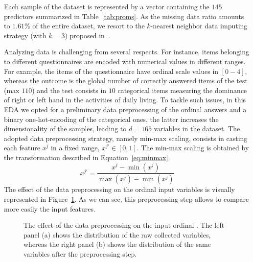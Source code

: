 Each sample of the dataset is represented by a vector containing the $145$ predictors summarized in Table~\ref{tab:proms}.
As the missing data ratio amounts to $1.61\%$ of the entire dataset, we resort to the $k$-nearest neighbor data imputing strategy (with $k=3$) proposed in~\cite{troyanskaya2001missing}.

Analyzing \PCO data is challenging from several respects.
For instance, items belonging to different questionnaires are encoded with numerical values in different ranges.
For example, the items of the \MFIS questionnaire have ordinal scale values in $[0-4]$, whereas the \SDMT outcome is the global number of correctly answered items of the test (max $110$) and the \EDINB test consists in $10$ categorical items measuring the dominance of right or left hand in the activities of daily living.
To tackle such issues, in this EDA we opted for a preliminary data preprocessing of the ordinal answers and a binary one-hot-encoding of the categorical ones, the latter increases the dimensionality of the samples, leading to $d=165$ variables in the dataset.
The adopted data preprocessing strategy, namely min-max scaling, consists in casting each feature $x^j$ in a fixed range, \ie $x^{j'} \in [0, 1]$. The min-max scaling is obtained by the transformation described in Equation~\eqref{eq:minmax}.
\begin{equation} \label{eq:minmax}
	x^{j'} = \frac{x^j - \min(x^j)}{\max(x^j) - \min(x^j)}
\end{equation}
The effect of the data preprocessing on the ordinal input variables is visually represented in Figure~\ref{fig:ms_boxplots}. As we can see, this preprocessing step allows to compare more easily the input features.

\begin{figure}[]
	\centering
	\caption{The effect of the data preprocessing on the input ordinal \PCOs. The left panel (a) shows the distribution of the raw collected variables, whereas the right panel (b) shows the distribution of the same variables after the preprocessing step.}\label{fig:ms_boxplots}
\end{figure}

